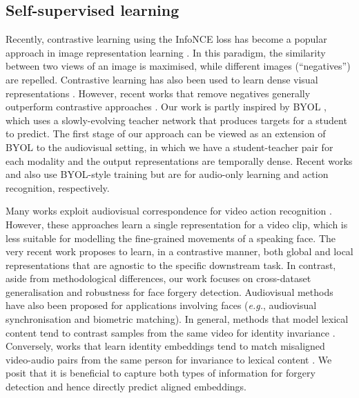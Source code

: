 \documentclass[10pt,twocolumn,letterpaper]{article}
\begin{document}
\subsection{Self-supervised learning}
\begin{description}[wide,itemindent=\labelsep]
\item[Image SSL.] Recently, contrastive learning using the InfoNCE loss \cite{oord2018representation} has become a popular approach in image representation learning \cite{chen2020simple, chen2020improved, he2020momentum, oord2018representation, wu2018unsupervised, henaff2020data, tian2020contrastive}. In this paradigm, the similarity between two views of an image is maximised, while different images (``negatives'') are repelled. Contrastive learning has also been used to learn dense visual representations \cite{wang2021dense, pinheiro2020unsupervised}. However, recent works that remove negatives generally outperform contrastive approaches \cite{caron2018deep, asano2019self, caron2020unsupervised, zbontar2021barlow, grill2020bootstrap, chen2021exploring, caron2021emerging}. Our work is partly inspired by BYOL \cite{grill2020bootstrap}, which uses a slowly-evolving teacher network that produces targets for a student to predict. The first stage of our approach can be viewed as an extension of BYOL to the audiovisual setting, in which we have a student-teacher pair for each modality and the output representations are temporally dense. Recent works \cite{niizumi2021byol} and \cite{recasens2021broaden, feichtenhofer2021large} also use BYOL-style training but are for audio-only learning and action recognition, respectively.

\item[Audiovisual SSL.] Many works exploit audiovisual correspondence for video action recognition \cite{arandjelovic2017look, arandjelovic2018objects, korbar2018cooperative, chung2016out, alwassel2019self, asano2020labelling, patrick2020multi, morgado2021audio, ma2020active}. However, these approaches learn a single representation for a video clip, which is less suitable for modelling the fine-grained movements of a speaking face. The very recent work \cite{ma2021contrastive} proposes to learn, in a contrastive manner, both global and local representations that are agnostic to the specific downstream task. In contrast, aside from methodological differences, our work focuses on cross-dataset generalisation and robustness for face forgery detection. Audiovisual methods have also been proposed for applications involving faces (\textit{e.g.}, audiovisual synchronisation and biometric matching). In general, methods that model lexical content tend to contrast samples from the same video for identity invariance \cite{chung2016out, chung2019perfect, chung2020seeing}. Conversely, works that learn identity embeddings tend to match misaligned video-audio pairs from the same person for invariance to lexical content \cite{nagrani2018seeing, nagrani2018learnable}. We posit that it is beneficial to capture both types of information for forgery detection and hence directly predict aligned embeddings.


\end{description}
\end{document}
